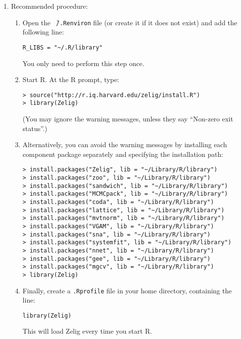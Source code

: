 \begin{enumerate}
\item Recommended procedure: 
  \begin{enumerate}
  \item Open the {\tt \~\,/.Renviron} file (or create it if it does
    not exist) and add the following line:
\begin{verbatim}
R_LIBS = "~/.R/library"
\end{verbatim}
    You only need to perform this step once.
  \item Start R.  At the R prompt, type:
\begin{verbatim}
> source("http://r.iq.harvard.edu/zelig/install.R")
> library(Zelig)
\end{verbatim}
(You may ignore the warning messages, unless they say ``Non-zero exit 
status''.)
\item Alternatively, you can avoid the warning messages by installing each 
component package separately and specifying the installation path:  
\begin{verbatim}
> install.packages("Zelig", lib = "~/Library/R/library")
> install.packages("zoo", lib = "~/Library/R/library")
> install.packages("sandwich", lib = "~/Library/R/library")
> install.packages("MCMCpack", lib = "~/Library/R/library")
> install.packages("coda", lib = "~/Library/R/library")
> install.packages("lattice", lib = "~/Library/R/library")
> install.packages("mvtnorm", lib = "~/Library/R/library")
> install.packages("VGAM", lib = "~/Library/R/library")
> install.packages("sna", lib = "~/Library/R/library")
> install.packages("systemfit", lib = "~/Library/R/library")
> install.packages("nnet", lib = "~/Library/R/library")
> install.packages("gee", lib = "~/Library/R/library")
> install.packages("mgcv", lib = "~/Library/R/library")
> library(Zelig)
\end{verbatim}
\item Finally, create a {\tt .Rprofile} file in your home directory, containing the line:
\begin{verbatim}
library(Zelig)
\end{verbatim}
This will load Zelig every time you start R.  
  \end{enumerate}  


\end{enumerate}
